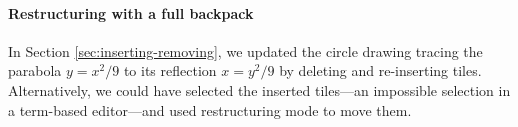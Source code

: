 




\paragraph{Restructuring with a full backpack}
In Section \ref{sec:inserting-removing}, we updated the circle drawing tracing the
parabola $y = x^2/9$ to its reflection $x = y^2/9$ by deleting
and re-inserting tiles.
Alternatively, we could have selected the inserted tiles---an impossible
selection in a term-based editor---and used
restructuring mode to move them. 

